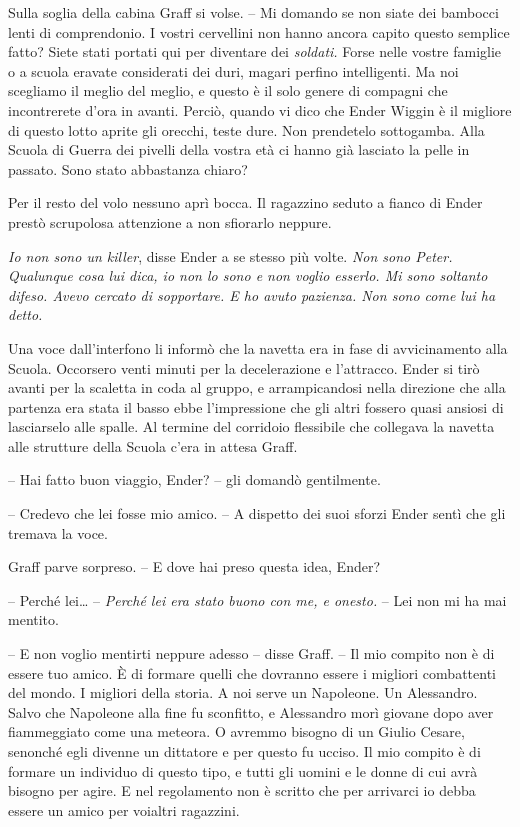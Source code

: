 {Sulla soglia della cabina Graff si volse. -- Mi domando se non siate
	dei bambocci lenti di comprendonio. I vostri cervellini non hanno ancora
	capito questo semplice fatto? Siete stati portati qui per diventare dei
	\emph{soldati.} Forse nelle vostre famiglie o a scuola eravate
	considerati dei duri, magari perfino intelligenti. Ma noi scegliamo il
	meglio del meglio, e questo è il solo genere di compagni che
	incontrerete d'ora in avanti. Perciò, quando vi dico che Ender Wiggin è
	il migliore di questo lotto aprite gli orecchi, teste dure. Non
	prendetelo sottogamba. Alla Scuola di Guerra dei pivelli della vostra
	età ci hanno già lasciato la pelle in passato. Sono stato abbastanza
	chiaro?}

{Per il resto del volo nessuno aprì bocca. Il ragazzino seduto a fianco
	di Ender prestò scrupolosa attenzione a non sfiorarlo neppure.}

\emph{{Io non sono un killer}}{, \emph{} disse Ender a se stesso più
	volte. \emph{Non sono Peter. Qualunque cosa lui dica, io non lo sono e
		non voglio esserlo. Mi sono soltanto difeso. Avevo cercato di
		sopportare. E ho avuto pazienza. Non sono come lui ha detto.}}

{Una voce dall'interfono li informò che la navetta era in fase di
	avvicinamento alla Scuola. Occorsero venti minuti per la decelerazione e
	l'attracco. Ender si tirò avanti per la scaletta in coda al gruppo, e
	arrampicandosi nella direzione che alla partenza era stata il basso ebbe
	l'impressione che gli altri fossero quasi ansiosi di lasciarselo alle
	spalle. Al termine del corridoio flessibile che collegava la navetta
	alle strutture della Scuola c'era in attesa Graff.}

{-- Hai fatto buon viaggio, Ender? -- gli domandò gentilmente.}

{-- Credevo che lei fosse mio amico. -- A dispetto dei suoi sforzi Ender
	sentì che gli tremava la voce.}

{Graff parve sorpreso. -- E dove hai preso questa idea, Ender?}

{-- Perché lei\ldots{} -- \emph{Perché lei era stato buono con me, e
		onesto.} -- Lei non mi ha mai mentito.}

{-- E non voglio mentirti neppure adesso -- disse Graff. -- Il mio
	compito non è di essere tuo amico. È di formare quelli che dovranno
	essere i migliori combattenti del mondo. I migliori della storia. A noi
	serve un Napoleone. Un Alessandro. Salvo che Napoleone alla fine fu
	sconfitto, e Alessandro morì giovane dopo aver fiammeggiato come una
	meteora. O avremmo bisogno di un Giulio Cesare, senonché egli divenne un
	dittatore e per questo fu ucciso. Il mio compito è di formare un
	individuo di questo tipo, e tutti gli uomini e le donne di cui avrà
	bisogno per agire. E nel regolamento non è scritto che per arrivarci io
	debba essere un amico per voialtri ragazzini.}


